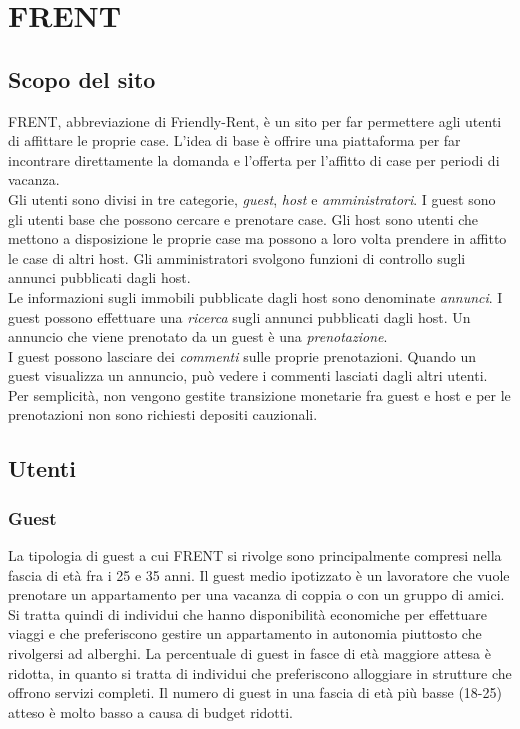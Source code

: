 \documentclass[1_relazione.tex]{subfiles}
\begin{document}
\section{FRENT}

\subsection{Scopo del sito}
FRENT, abbreviazione di Friendly-Rent, è un sito per far permettere agli utenti di affittare le proprie case. L'idea di base è offrire una piattaforma per far incontrare direttamente la domanda e l'offerta per l'affitto di case per periodi di vacanza. \\
Gli utenti sono divisi in tre categorie,  \textit{guest}, \textit{host} e \textit{amministratori}. I guest sono gli utenti base che possono cercare e prenotare case. Gli host sono utenti che mettono a disposizione le proprie case ma possono a loro volta prendere in affitto le case di altri host. Gli amministratori svolgono funzioni di controllo sugli annunci pubblicati dagli host. \\
Le informazioni sugli immobili pubblicate dagli host sono denominate \textit{annunci}. I guest possono effettuare una \textit{ricerca} sugli annunci pubblicati dagli host. Un annuncio che viene prenotato da un guest è una \textit{prenotazione}. \\
I guest possono lasciare dei \textit{commenti} sulle proprie prenotazioni. Quando un guest visualizza un annuncio, può vedere i commenti lasciati dagli altri utenti. \\
Per semplicità, non vengono gestite transizione monetarie fra guest e host e per le prenotazioni non sono richiesti depositi cauzionali. 

\subsection{Utenti}

\subsubsection{Guest} 

La tipologia di guest a cui FRENT si rivolge sono principalmente compresi nella fascia di età fra i 25 e 35 anni. Il guest medio ipotizzato è un lavoratore che vuole prenotare un appartamento per una vacanza di coppia o con un gruppo di amici. Si tratta quindi di individui che hanno disponibilità economiche per effettuare viaggi e che preferiscono gestire un appartamento in autonomia piuttosto che rivolgersi ad alberghi. La percentuale di guest in fasce di età maggiore attesa è ridotta, in quanto si tratta di individui che preferiscono alloggiare in strutture che offrono servizi completi.  Il numero di guest in una fascia di età più basse (18-25) atteso è molto basso a causa di budget ridotti.   \\
\end{document}

